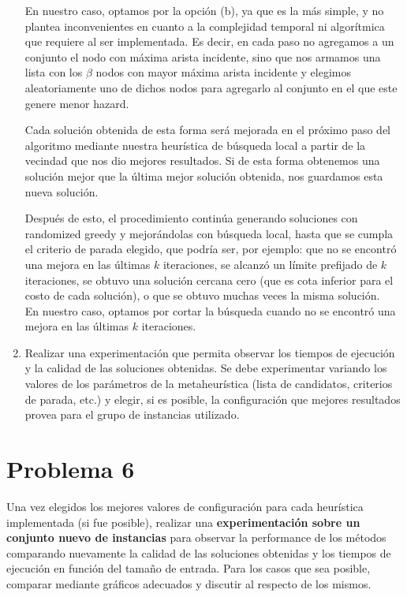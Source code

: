\documentclass[11pt, a4paper, twoside]{article}
\begin{document}
\begin{enumerate}
			  En nuestro caso, optamos por la opción (b), ya que es la más simple, y no plantea inconvenientes en cuanto a la complejidad 
			  temporal ni algorítmica que requiere al ser implementada. Es decir, en cada paso no agregamos a un conjunto
			  el nodo con máxima arista incidente, sino que nos armamos una lista con los $\beta$ nodos con mayor máxima arista
			  incidente y elegimos aleatoriamente uno de dichos nodos para agregarlo al conjunto en el que
			  este genere menor hazard.
			  
			  Cada solución obtenida de esta forma será mejorada en el próximo paso del algoritmo mediante 
			  nuestra heurística de búsqueda local a partir de la vecindad que nos dio mejores resultados. 
			  Si de esta forma obtenemos una solución mejor que la última mejor solución obtenida, nos guardamos esta nueva solución.
			  
			  Después de esto, el procedimiento continúa generando soluciones con randomized greedy y mejorándolas con búsqueda local,
			  hasta que se cumpla el criterio de parada elegido, que podría ser, por ejemplo: que no se 
			  encontró una mejora en las últimas $k$ iteraciones, se alcanzó un límite prefijado de $k$ iteraciones, se obtuvo
			  una solución cercana cero (que es cota inferior para el costo de cada solución), o que se obtuvo muchas 
			  veces la misma solución. \\
			  En nuestro caso, optamos por cortar la búsqueda cuando no se encontró una mejora en las últimas $k$ iteraciones.
			  
			  
		\item Realizar una experimentación que permita observar los tiempos de ejecución y la calidad de las soluciones
			  obtenidas. Se debe experimentar variando los valores de los parámetros de la metaheurística (lista de candidatos,
			  criterios de parada, etc.) y elegir, si es posible, la configuración que mejores resultados provea para el
			  grupo de instancias utilizado.
			  
	 \end{enumerate}



\newpage
\section{Problema 6}
	Una vez elegidos los mejores valores de configuración para cada heurística implementada (si fue posible), realizar
	una \textbf{experimentación sobre un conjunto nuevo de instancias} para observar la performance de los métodos comparando
	nuevamente la calidad de las soluciones obtenidas y los tiempos de ejecución en función del tamaño de entrada. Para
	los casos que sea posible, comparar mediante gráficos adecuados y discutir al respecto de los mismos.


\end{document}
